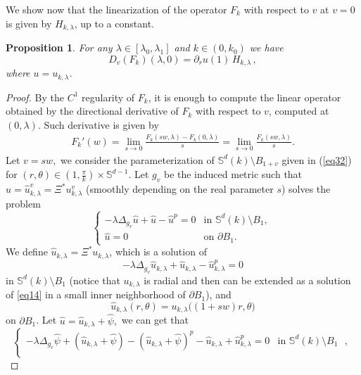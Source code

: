 \documentclass[reqno]{amsart}
\newtheorem{proposition}[theorem]{Proposition}
\numberwithin{equation}{section}
\newenvironment{key words}{\textbf{Keywords}\mbox{  }}{ }
\begin{document}
\medskip

We show now that the linearization of the operator $F_k$ with respect to $v$ at $v=0$ is given by $H_{k,\lambda}$, up to a constant.

\begin{proposition} \label{Pr32}
For any $\lambda\in[\lambda_{0},\lambda_{1}]$ and $k \in (0, k_0)$ we have
\[
D_{v}(F_k)(\lambda, 0) = \partial_{r}u(1)\, H_{k, \lambda}\,,
\]
where $u=u_{k,\lambda}$.
 \end{proposition}

\begin{proof}
By the $C^1$ regularity of $F_k$, it is enough to compute the linear operator obtained by the directional derivative of $F_k$ with respect to $v$, computed at $(0,\lambda)$. Such derivative is given by
\begin{align*}
   F_k'(w)=\mathop {\lim}\limits_{s\rightarrow 0}\frac{F_k(sw,\lambda)-F_k(0,\lambda)}{s}=\mathop {\lim}\limits_{s\rightarrow 0}\frac{F_k(sw,\lambda)}{s}.
    \end{align*}
    Let $v=sw,$ we consider the parameterization of $\mathbb{S}^{d}(k)\setminus B_{1+v}$ given in (\ref{eq32}) for $(r,\theta)\in \left(1,\frac{\pi}{k}\right)\times\mathbb{S}^{d-1}$. Let $g_{v}$ be the induced metric such that $\hat{u} = \hat u^v_{k,\lambda} =\Xi^{*}u^v_{k,\lambda}$ (smoothly depending on the real parameter $s$) solves the problem
    \begin{equation*}
     \begin{cases}
     -\lambda\Delta_{g_{v}}\hat{u}+\hat{u}-\hat{u}^{p}=0 &\mbox{in $\mathbb{S}^{d}(k)\setminus B_{1}$, }\\
      \hat{u}=0 &\mbox{on $\partial B_{1}$}.
      \end{cases}
    \end{equation*}
 We define $\hat{u}_{k, \lambda}=\Xi^{*}u_{k,\lambda}$, which is a solution of
\[-\lambda\Delta_{g_{v}}\hat{u}_{k,\lambda}+\hat{u}_{k,\lambda}-\hat{u}_{k,\lambda}^{p}=0\]
in $\mathbb{S}^{d}(k)\setminus B_{1}$ (notice that $u_{k,\lambda}$ is radial and then can be extended as a solution of \eqref{eq14} in a small inner neighborhood of $\partial B_1$), and
\[\hat{u}_{k,\lambda}(r,\theta)=u_{k,\lambda}\big((1+sw)r,\theta\big)\]
on $\partial B_1$. Let $\hat{u}=\hat{u}_{k,\lambda}+\hat{\psi},$ we can get that
\begin{equation}\label{eq37}
     \begin{cases}
     -\lambda\Delta_{g_{v}}\hat{\psi}+(\hat{u}_{k,\lambda}+\hat{\psi})-(\hat{u}_{k,\lambda}+\hat{\psi})^{p}-\hat{u}_{k,\lambda}+\hat{u}_{k,\lambda}^{p}=0  &\mbox{in $\mathbb{S}^{d}(k)\setminus B_{1}$ },\\

\end{cases}
\end{equation}
\end{proof}
\end{document}
